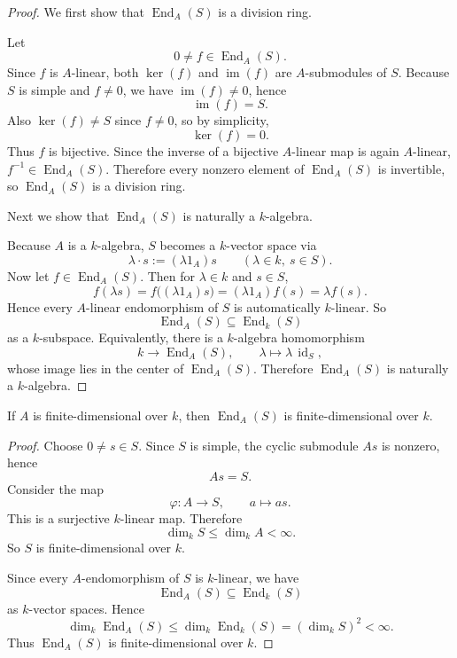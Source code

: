 \begin{proof}
    We first show that $\operatorname{End}_A(S)$ is a division ring.

    Let
    \[
        0\neq f\in \operatorname{End}_A(S).
    \]
    Since $f$ is $A$-linear, both $\ker(f)$ and $\operatorname{im}(f)$ are $A$-submodules of $S$.
    Because $S$ is simple and $f\neq 0$, we have $\operatorname{im}(f)\neq 0$, hence
    \[
        \operatorname{im}(f)=S.
    \]
    Also $\ker(f)\neq S$ since $f\neq 0$, so by simplicity,
    \[
        \ker(f)=0.
    \]
    Thus $f$ is bijective. Since the inverse of a bijective $A$-linear map is again $A$-linear,
    $f^{-1}\in \operatorname{End}_A(S)$. Therefore every nonzero element of
    $\operatorname{End}_A(S)$ is invertible, so $\operatorname{End}_A(S)$ is a division ring.

    Next we show that $\operatorname{End}_A(S)$ is naturally a $k$-algebra.

    Because $A$ is a $k$-algebra, $S$ becomes a $k$-vector space via
    \[
        \lambda\cdot s := (\lambda 1_A)s
        \qquad (\lambda\in k,\ s\in S).
    \]
    Now let $f\in \operatorname{End}_A(S)$. Then for $\lambda\in k$ and $s\in S$,
    \[
        f(\lambda s)
        =
        f\bigl((\lambda 1_A)s\bigr)
        =
        (\lambda 1_A)f(s)
        =
        \lambda f(s).
    \]
    Hence every $A$-linear endomorphism of $S$ is automatically $k$-linear. So
    \[
        \operatorname{End}_A(S)\subseteq \operatorname{End}_k(S)
    \]
    as a $k$-subspace. Equivalently, there is a $k$-algebra homomorphism
    \[
        k\longrightarrow \operatorname{End}_A(S),
        \qquad
        \lambda\longmapsto \lambda\,\operatorname{id}_S,
    \]
    whose image lies in the center of $\operatorname{End}_A(S)$. Therefore
    $\operatorname{End}_A(S)$ is naturally a $k$-algebra.
\end{proof}

\begin{lemma}
    If $A$ is finite-dimensional over $k$, then $\operatorname{End}_A(S)$ is finite-dimensional over $k$.
\end{lemma}

\begin{proof}
    Choose $0\neq s\in S$. Since $S$ is simple, the cyclic submodule $As$ is nonzero, hence
    \[
        As=S.
    \]
    Consider the map
    \[
        \varphi:A\longrightarrow S,
        \qquad
        a\longmapsto as.
    \]
    This is a surjective $k$-linear map. Therefore
    \[
        \dim_k S\leq \dim_k A<\infty.
    \]
    So $S$ is finite-dimensional over $k$.

    Since every $A$-endomorphism of $S$ is $k$-linear, we have
    \[
        \operatorname{End}_A(S)\subseteq \operatorname{End}_k(S)
    \]
    as $k$-vector spaces. Hence
    \[
        \dim_k \operatorname{End}_A(S)
        \leq
        \dim_k \operatorname{End}_k(S)
        =
        (\dim_k S)^2
        <\infty.
    \]
    Thus $\operatorname{End}_A(S)$ is finite-dimensional over $k$.
\end{proof}

